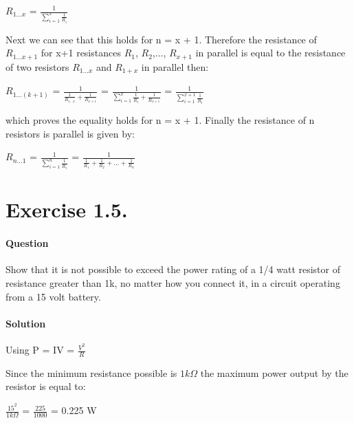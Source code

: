 \documentclass[a4paper, 12pt]{article}
\begin{document}
$R_{1...x}$ = $\frac{1}{\sum^{x}_{i=1} \frac{1}{R_i}}$\newline

Next we can see that this holds for n = x + 1. Therefore the resistance of $R_{1...x+1}$ for x+1 resistances $R_1$, $R_2$,..., $R_{x+1}$ in parallel is equal to the resistance of two resistors $R_{1...x}$ and $R_{1+x}$ in parallel then:\newline

$R_{1...(k+1)}$ = $\frac{1}{\frac{1}{R_{1...x}} + \frac{1}{R_{x+1}}}$ = $\frac{1}{\sum^{x}_{i=1} \frac{1}{R_i} + \frac{1}{R_{x+1}}}$ = $\frac{1}{\sum^{x+1}_{i=1} \frac{1}{R_i}}$\newline

which proves the equality holds for n = x + 1. Finally the resistance of n resistors is parallel is given by:\newline

$R_{n...1}$ = $\frac{1}{\sum^{n}_{i=1} \frac{1}{R_i}}$ = $\frac{1}{\frac{1}{R_1} + \frac{1}{R_2} + ... + \frac{1}{R_n}}$\newline

\clearpage

\section{Exercise 1.5.}

\paragraph{Question\newline}

Show that it is not possible to exceed the power rating of a 1/4 watt resistor of resistance greater than 1k, no matter how you connect it, in a circuit operating from a 15 volt battery.

\paragraph{Solution\newline}

Using P = IV = $\frac{V^2}{R}$\newline

Since the minimum resistance possible is $1k\Omega$ the maximum power output by the resistor is equal to:\newline

$\frac{15^2}{1k\Omega}$ = $\frac{225}{1000}$ = 0.225 W\newline
\end{document}
